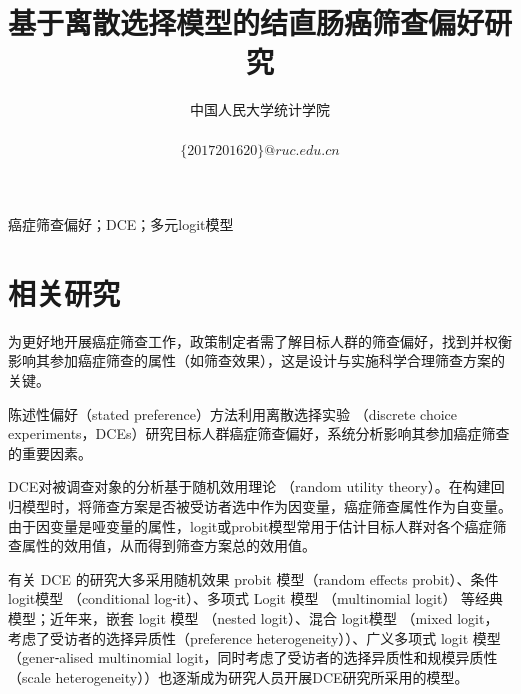 \documentclass[10pt, conference, compsocconf]{IEEEtran}
\begin{document}
\begin{CJK}{UTF8}{gbsn}
\title{基于离散选择模型的结直肠癌筛查偏好研究}
\author
{
\IEEEauthorblockA
{
中国人民大学统计学院\\
}
$ $\\
$\{2017201620\}@ruc.edu.cn$
}

\maketitle

\begin{IEEEkeywords}
癌症筛查偏好；DCE；多元logit模型
\end{IEEEkeywords}


\IEEEpeerreviewmaketitle
\section{相关研究}
为更好地开展癌症筛查工作，政策制定者需了解目标人群的筛查偏好，找到并权衡影响其参加癌症筛查的属性（如筛查效果），这是设计与实施科学合理筛查方案的关键。

陈述性偏好（stated preference）方法利用离散选择实验 （discrete choice experiments，DCEs）研究目标人群癌症筛查偏好，系统分析影响其参加癌症筛查的重要因素\parencite{刘童童离散选择实验用于癌症筛查偏好的国际研究进展}。



DCE对被调查对象的分析基于随机效用理论 （random utility theory）\parencite{宋奎勐利用离散选择实验研究卫生服务人员工作偏好的国际研究进展}。在构建回归模型时，将筛查方案是否被受访者选中作为因变量，癌症筛查属性作为自变量。由于因变量是哑变量的属性，logit或probit模型常用于估计目标人群对各个癌症筛查属性的效用值，从而得到筛查方案总的效用值。

有关 DCE 的研究大多采用随机效果 probit 模型（random effects probit）、条件logit模型 （conditional log⁃it）、多项式 Logit 模型 （multinomial logit） 等经典模型；近年来，嵌套 logit 模型 （nested logit）、混合 logit模型 （mixed logit，考虑了受访者的选择异质性\parencite{milte2014cognitive}（preference heterogeneity））、广义多项式 logit 模型 （gener⁃alised multinomial logit，同时考虑了受访者的选择异质性和规模异质性\parencite{kjaer2008preference} （scale heterogeneity））也逐渐成为研究人员开展DCE研究所采用的模型。



\end{CJK}
\end{document}
